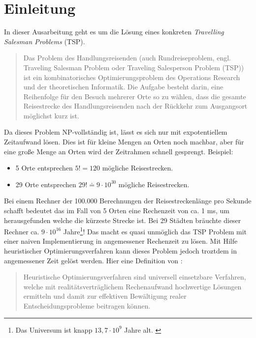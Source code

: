 \section{Einleitung}

In dieser Ausarbeitung geht es um die Lösung eines konkreten
\emph{Travelling Salesman Problems} (TSP).

\begin{quote}
Das Problem des Handlungsreisenden (auch Rundreiseproblem, engl.
Traveling Salesman Problem oder Traveling Salesperson Problem (TSP))
ist ein kombinatorisches Optimierungsproblem des Operations Research und
der theoretischen Informatik. Die Aufgabe besteht darin, eine Reihenfolge
für den Besuch mehrerer Orte so zu wählen, dass die gesamte Reisestrecke
des Handlungsreisenden nach der Rückkehr zum Ausgangsort möglichst
kurz ist. \citep{wikiTsp}
\end{quote}

\noindent Da dieses Problem NP-vollständig ist, lässt es sich nur mit
expotentiellem Zeitaufwand lösen.
Dies ist für kleine Mengen an Orten noch machbar, aber für eine große
Menge an Orten wird der Zeitrahmen schnell gesprengt.
Beispiel:

\begin{itemize}
  \item 5 Orte entsprechen $5! = 120$ mögliche Reisestrecken.
  \item 29 Orte entsprechen $29! \doteq 9 \cdot 10^{30}$ mögliche Reisestrecken.
\end{itemize}

\noindent Bei einem Rechner der 100.000 Berechnungen der Reisestreckenlänge pro
Sekunde schafft bedeutet das im Fall von 5 Orten eine Rechenzeit
von ca. 1 ms, um herausgefunden welche die kürzeste Strecke ist.
Bei 29 Städten bräuchte dieser Rechner ca. $9 \cdot 10^{16}$
Jahre\footnote{Das Universum ist
knapp $13,7 \cdot 10^{9}$ Jahre alt. \citep[siehe][]{wikiUniversum}}!
Das macht es quasi unmöglich das TSP Problem mit einer naiven Implementierung
in angemessener Rechenzeit zu lösen.
Mit Hilfe heuristischer Optimierungsverfahren kann dieses Problem
jedoch troztdem in angemessener Zeit gelöst werden. Hier eine Definition
von \citep{fink}:

\begin{quote}
Heuristische Optimierungsverfahren sind universell einsetzbare Verfahren,
welche mit realitätsverträglichem Rechenaufwand hochwertige Lösungen
ermitteln und damit zur effektiven Bewältigung realer Entscheidungsprobleme
beitragen können. \citep[S.~1]{fink}
\end{quote}

